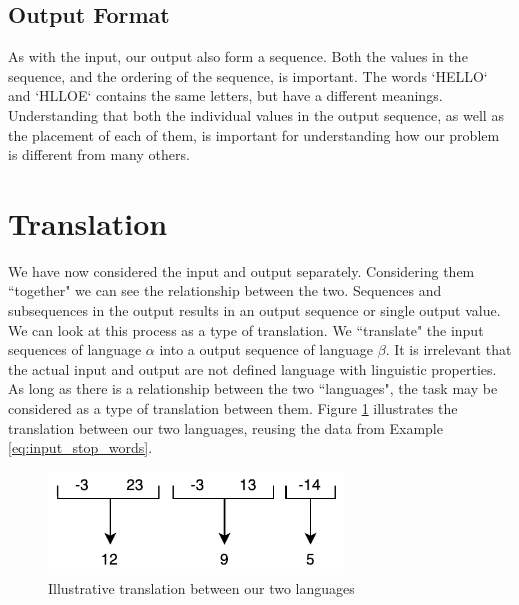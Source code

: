 \subsection{Output Format}
As with the input, our output also form a sequence. Both the values in the sequence, and the ordering of the sequence, is important. The words `HELLO` and `HLLOE` contains the same letters, but have a different meanings. Understanding that both the individual values in the output sequence, as well as the placement of each of them, is important for understanding how our problem is different from many others.


\section{Translation}
We have now considered the input and output separately. Considering them ``together" we can see the relationship between the two. Sequences and subsequences in the output results in an output sequence or single output value. We can look at this process as a type of translation. We ``translate" the input sequences of language $\alpha$ into a output sequence of language $\beta$. It is irrelevant that the actual input and output are not defined language with linguistic properties. As long as there is a relationship between the two ``languages", the task may be considered as a type of translation between them. Figure \ref{fig:number_translation} illustrates the translation between our two languages, reusing the data from Example \ref{eq:input_stop_words}. 

\begin{figure}[h]
    \centering
    \includegraphics[width=0.7\textwidth]{fig/background_theory/number_translation.pdf}
    \caption{Illustrative translation between our two languages}
    \label{fig:number_translation}
\end{figure}